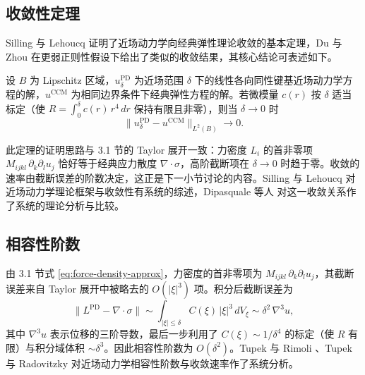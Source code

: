 \subsection{收敛性定理}
\label{subsec:convergence-theorem}

Silling 与 Lehoucq \cite{SillingLehoucq2008} 证明了近场动力学向经典弹性理论收敛的基本定理，Du 与 Zhou \cite{DuZhou2011} 在更弱正则性假设下给出了类似的收敛结果，其核心结论可表述如下。

\begin{theorem}[局部收敛性]
\label{thm:convergence}
设 $B$ 为 Lipschitz 区域，$u^{\mathrm{PD}}_\delta$ 为近场范围 $\delta$ 下的线性各向同性键基近场动力学方程的解，$u^{\mathrm{CCM}}$ 为相同边界条件下经典弹性方程的解。若微模量 $c(r)$ 按 $\delta$ 适当标定（使 $R=\int_0^\delta c(r)\,r^4\,dr$ 保持有限且非零），则当 $\delta\to 0$ 时
\begin{equation}
\label{eq:convergence}
\|u^{\mathrm{PD}}_\delta - u^{\mathrm{CCM}}\|_{L^2(B)} \to 0.
\end{equation}
\end{theorem}

此定理的证明思路与 3.1 节的 Taylor 展开一致：力密度 $L_i$ 的首非零项 $M_{ijkl}\,\partial_k\partial_l u_j$ 恰好等于经典应力散度 $\nabla\cdot\sigma$，高阶截断项在 $\delta\to 0$ 时趋于零。收敛的速率由截断误差的阶数决定，这正是下一小节讨论的内容。Silling 与 Lehoucq \cite{SillingLehoucq2010} 对近场动力学理论框架与收敛性有系统的综述，Dipasquale 等人 \cite{Dipasquale2014} 对这一收敛关系作了系统的理论分析与比较。

\subsection{相容性阶数}
\label{subsec:consistency-order}

由 3.1 节式 \eqref{eq:force-density-approx}，力密度的首非零项为 $M_{ijkl}\,\partial_k\partial_l u_j$，其截断误差来自 Taylor 展开中被略去的 $O(|\xi|^3)$ 项。积分后截断误差为
\begin{equation}
\label{eq:truncation-error}
\|L^{\mathrm{PD}} - \nabla\cdot\sigma\| \sim \int_{|\xi|\le\delta} C(\xi)\,|\xi|^3\,dV_\xi \sim \delta^2\,\nabla^3 u,
\end{equation}
其中 $\nabla^3 u$ 表示位移的三阶导数，最后一步利用了 $C(\xi)\sim 1/\delta^4$ 的标定（使 $R$ 有限）与积分域体积 $\sim\delta^3$。因此相容性阶数为 $O(\delta^2)$。Tupek 与 Rimoli \cite{TupekRimoli2013}、Tupek 与 Radovitzky \cite{TupekRadovitzky2014} 对近场动力学相容性阶数与收敛速率作了系统分析。

